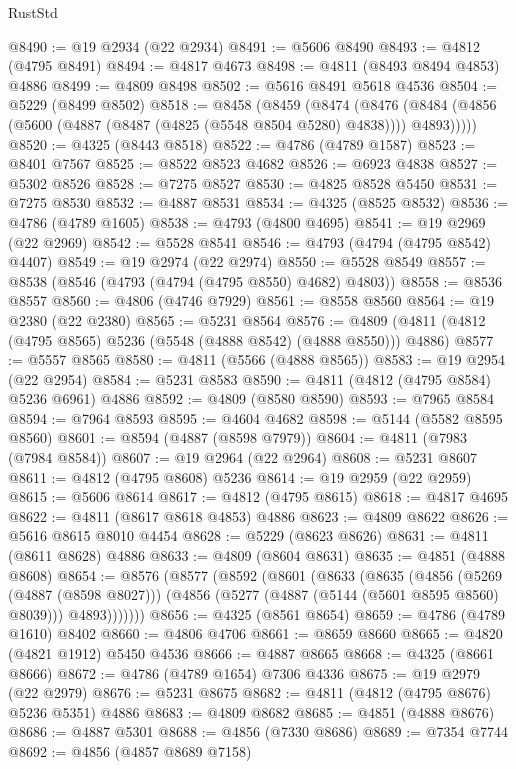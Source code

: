 \begin{lexlean}{RustStd}
\begin{coremodule}
@8490 := @19 @2934 (@22 @2934)
@8491 := @5606 @8490
@8493 := @4812 (@4795 @8491)
@8494 := @4817 @4673
@8498 := @4811 (@8493 @8494 @4853) @4886
@8499 := @4809 @8498
@8502 := @5616 @8491 @5618 @4536
@8504 := @5229 (@8499 @8502)
@8518 := @8458
    (@8459
      (@8474
        (@8476 (@8484 (@4856 (@5600 (@4887 (@8487 (@4825 (@5548 @8504 @5280) @4838)))) @4893)))))
@8520 := @4325 (@8443 @8518)
@8522 := @4786 (@4789 @1587)
@8523 := @8401 @7567
@8525 := @8522 @8523 @4682
@8526 := @6923 @4838
@8527 := @5302 @8526
@8528 := @7275 @8527
@8530 := @4825 @8528 @5450
@8531 := @7275 @8530
@8532 := @4887 @8531
@8534 := @4325 (@8525 @8532)
@8536 := @4786 (@4789 @1605)
@8538 := @4793 (@4800 @4695)
@8541 := @19 @2969 (@22 @2969)
@8542 := @5528 @8541
@8546 := @4793 (@4794 (@4795 @8542) @4407)
@8549 := @19 @2974 (@22 @2974)
@8550 := @5528 @8549
@8557 := @8538 (@8546 (@4793 (@4794 (@4795 @8550) @4682) @4803))
@8558 := @8536 @8557
@8560 := @4806 (@4746 @7929)
@8561 := @8558 @8560
@8564 := @19 @2380 (@22 @2380)
@8565 := @5231 @8564
@8576 := @4809 (@4811 (@4812 (@4795 @8565) @5236 (@5548 (@4888 @8542) (@4888 @8550))) @4886)
@8577 := @5557 @8565
@8580 := @4811 (@5566 (@4888 @8565))
@8583 := @19 @2954 (@22 @2954)
@8584 := @5231 @8583
@8590 := @4811 (@4812 (@4795 @8584) @5236 @6961) @4886
@8592 := @4809 (@8580 @8590)
@8593 := @7965 @8584
@8594 := @7964 @8593
@8595 := @4604 @4682
@8598 := @5144 (@5582 @8595 @8560)
@8601 := @8594 (@4887 (@8598 @7979))
@8604 := @4811 (@7983 (@7984 @8584))
@8607 := @19 @2964 (@22 @2964)
@8608 := @5231 @8607
@8611 := @4812 (@4795 @8608) @5236
@8614 := @19 @2959 (@22 @2959)
@8615 := @5606 @8614
@8617 := @4812 (@4795 @8615)
@8618 := @4817 @4695
@8622 := @4811 (@8617 @8618 @4853) @4886
@8623 := @4809 @8622
@8626 := @5616 @8615 @8010 @4454
@8628 := @5229 (@8623 @8626)
@8631 := @4811 (@8611 @8628) @4886
@8633 := @4809 (@8604 @8631)
@8635 := @4851 (@4888 @8608)
@8654 := @8576
    (@8577
      (@8592
        (@8601
          (@8633
            (@8635
              (@4856
                (@5269 (@4887 (@8598 @8027)))
                (@4856 (@5277 (@4887 (@5144 (@5601 @8595 @8560) @8039))) @4893)))))))
@8656 := @4325 (@8561 @8654)
@8659 := @4786 (@4789 @1610) @8402
@8660 := @4806 @4706
@8661 := @8659 @8660
@8665 := @4820 (@4821 @1912) @5450 @4536
@8666 := @4887 @8665
@8668 := @4325 (@8661 @8666)
@8672 := @4786 (@4789 @1654) @7306 @4336
@8675 := @19 @2979 (@22 @2979)
@8676 := @5231 @8675
@8682 := @4811 (@4812 (@4795 @8676) @5236 @5351) @4886
@8683 := @4809 @8682
@8685 := @4851 (@4888 @8676)
@8686 := @4887 @5301
@8688 := @4856 (@7330 @8686)
@8689 := @7354 @7744
@8692 := @4856 (@4857 @8689 @7158)

\end{coremodule}
\end{lexlean}
